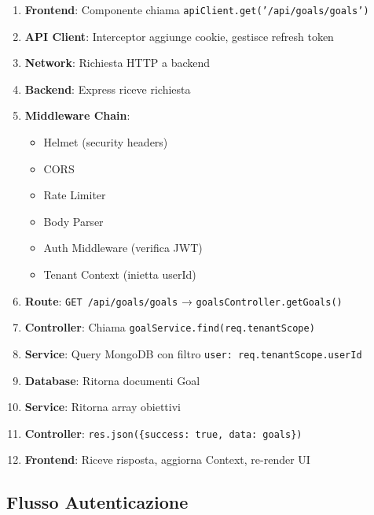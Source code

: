 \documentclass[11pt,a4paper]{article}
\begin{document}
\begin{enumerate}
    \item \textbf{Frontend}: Componente chiama \texttt{apiClient.get('/api/goals/goals')}
    \item \textbf{API Client}: Interceptor aggiunge cookie, gestisce refresh token
    \item \textbf{Network}: Richiesta HTTP a backend
    \item \textbf{Backend}: Express riceve richiesta
    \item \textbf{Middleware Chain}:
    \begin{itemize}
        \item Helmet (security headers)
        \item CORS
        \item Rate Limiter
        \item Body Parser
        \item Auth Middleware (verifica JWT)
        \item Tenant Context (inietta userId)
    \end{itemize}
    \item \textbf{Route}: \texttt{GET /api/goals/goals} → \texttt{goalsController.getGoals()}
    \item \textbf{Controller}: Chiama \texttt{goalService.find(req.tenantScope)}
    \item \textbf{Service}: Query MongoDB con filtro \texttt{user: req.tenantScope.userId}
    \item \textbf{Database}: Ritorna documenti Goal
    \item \textbf{Service}: Ritorna array obiettivi
    \item \textbf{Controller}: \texttt{res.json(\{success: true, data: goals\})}
    \item \textbf{Frontend}: Riceve risposta, aggiorna Context, re-render UI
\end{enumerate}

\subsection{Flusso Autenticazione}
\end{document}
